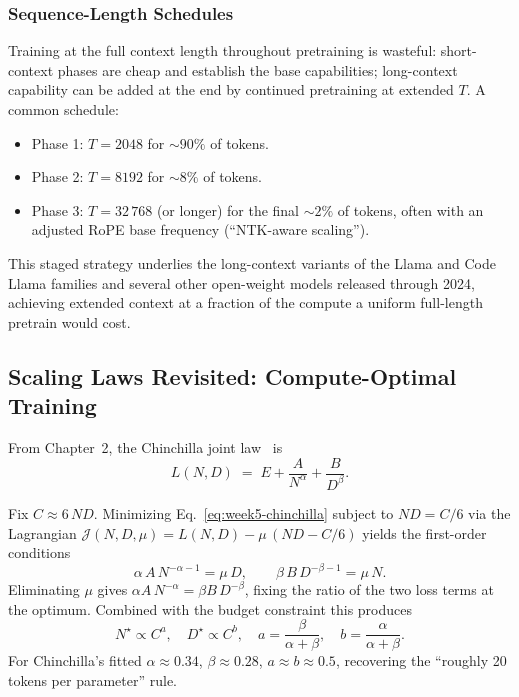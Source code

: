 \subsubsection{Sequence-Length Schedules}

Training at the full context length throughout pretraining is
wasteful: short-context phases are cheap and establish the base
capabilities; long-context capability can be added at the end by
continued pretraining at extended $T$. A common schedule:
\begin{itemize}
  \item Phase 1: $T = 2048$ for $\sim\!90\%$ of tokens.
  \item Phase 2: $T = 8192$ for $\sim\!8\%$ of tokens.
  \item Phase 3: $T = 32\,768$ (or longer) for the final $\sim\!2\%$
        of tokens, often with an adjusted RoPE base frequency
        (``NTK-aware scaling'').
\end{itemize}
This staged strategy underlies the long-context variants of the
Llama and Code Llama families and several other open-weight models
released through 2024, achieving extended context at a fraction of
the compute a uniform full-length pretrain would cost.

\subsection{Scaling Laws Revisited: Compute-Optimal Training}

From Chapter~2, the Chinchilla joint law~\citep{hoffmann2022chinchilla}
is
\begin{equation}
\label{eq:week5-chinchilla}
L(N, D) \;=\; E + \frac{A}{N^\alpha} + \frac{B}{D^\beta}.
\end{equation}

\begin{derivation}
Fix $C \approx 6\,N D$. Minimizing Eq.~\eqref{eq:week5-chinchilla}
subject to $N D = C/6$ via the Lagrangian
$\mathcal{J}(N, D, \mu) = L(N, D) - \mu\,(N D - C/6)$ yields the
first-order conditions
\[
\alpha\,A\,N^{-\alpha-1} = \mu\,D,
\qquad
\beta\,B\,D^{-\beta-1} = \mu\,N.
\]
Eliminating $\mu$ gives
$\alpha A\,N^{-\alpha} = \beta B\,D^{-\beta}$, fixing the ratio of the
two loss terms at the optimum. Combined with the budget constraint
this produces
\[
N^\star \propto C^{a},
\quad
D^\star \propto C^{b},
\quad
a = \frac{\beta}{\alpha + \beta},
\quad
b = \frac{\alpha}{\alpha + \beta}.
\]
For Chinchilla's fitted $\alpha \approx 0.34$, $\beta \approx 0.28$,
$a \approx b \approx 0.5$, recovering the
``roughly 20 tokens per parameter'' rule.
\end{derivation}

